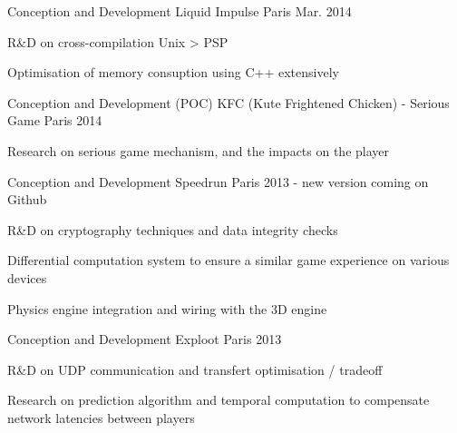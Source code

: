 

\begin{cventries}

  \cventry
    {Conception and Development} %
    {Liquid Impulse} %
    {Paris} %
    {Mar. 2014} %
    {
      \begin{cvitems} %
        \item {R\&D on cross-compilation Unix > PSP}
        \item {Optimisation of memory consuption using C++ extensively}
      \end{cvitems}
    }

  \cventry
    {Conception and Development (POC)} %
    {KFC (Kute Frightened Chicken) - Serious Game} %
    {Paris} %
    {2014} %
    {
      \begin{cvitems} %
        \item {Research on serious game mechanism, and the impacts on the player}
      \end{cvitems}
    }

  \cventry
    {Conception and Development} %
    {Speedrun} %
    {Paris} %
    {2013 - new version coming on Github} %
    {
      \begin{cvitems} %
        \item {R\&D on cryptography techniques and data integrity checks}
        \item {Differential computation system to ensure a similar game experience on various devices}
        \item {Physics engine integration and wiring with the 3D engine}
      \end{cvitems}
    }

  \cventry
    {Conception and Development} %
    {Exploot} %
    {Paris} %
    {2013} %
    {
      \begin{cvitems} %
        \item {R\&D on UDP communication and transfert optimisation / tradeoff}
        \item {Research on prediction algorithm and temporal computation to compensate network latencies between players}
      \end{cvitems}
    }


\end{cventries}

